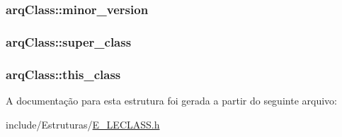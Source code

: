 \subsubsection[{minor\+\_\+version}]{ arq\+Class\+::minor\+\_\+version}\label{structarq_class_a90b447e4eea035e1dd5fb45360a6a09f}
\hypertarget{structarq_class_a7bd81d496166908031c40895ed667ada}{}
\subsubsection[{super\+\_\+class}]{ arq\+Class\+::super\+\_\+class}\label{structarq_class_a7bd81d496166908031c40895ed667ada}
\hypertarget{structarq_class_a0fa1b4b35fcc35e25fff7563f1ce7b2b}{}
\subsubsection[{this\+\_\+class}]{ arq\+Class\+::this\+\_\+class}\label{structarq_class_a0fa1b4b35fcc35e25fff7563f1ce7b2b}


A documentação para esta estrutura foi gerada a partir do seguinte arquivo\+:\begin{DoxyCompactItemize}
\item 
include/\+Estruturas/\hyperlink{_e___l_e_c_l_a_s_s_8h}{E\+\_\+\+L\+E\+C\+L\+A\+S\+S.\+h}\end{DoxyCompactItemize}
